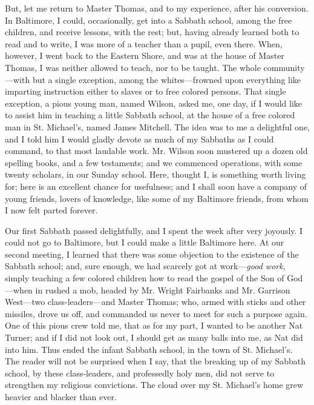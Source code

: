 But, let me return to Master Thomas, and to my experience, after his
conversion. In Baltimore, I could, occasionally, get into a Sabbath
school, among the free children, and receive lessons, with the rest;
but, having already learned both to read and to write, I was more of a
teacher than a pupil, even there. When, however, I went back to the
Eastern Shore, and was at the house of Master Thomas, I was neither
allowed to teach, nor to be taught. The whole community---with but a
single exception, among the whites---frowned upon everything like
imparting instruction either to slaves or to free colored persons. That
single exception, a pious young man, named Wilson, asked me, one day, if
I would like to assist him in teaching a little Sabbath school, at the
house of a free colored man in St. Michael's, named James Mitchell. The
idea was to me a delightful one, and I told him I would gladly devote as
much of my Sabbaths as I could command, to that most laudable work. Mr.
Wilson soon mustered up a dozen old spelling books, and a few
testaments; and we commenced operations, with some twenty scholars, in
our {}Sunday school. Here, thought I, is something worth living for;
here is an excellent chance for usefulness; and I shall soon have a
company of young friends, lovers of knowledge, like some of my Baltimore
friends, from whom I now felt parted forever.

Our first Sabbath passed delightfully, and I spent the week after very
joyously. I could not go to Baltimore, but I could make a little
Baltimore here. At our second meeting, I learned that there was some
objection to the existence of the Sabbath school; and, sure enough, we
had scarcely got at work---\emph{good work}, simply teaching a few
colored children how to read the gospel of the Son of God---when in
rushed a mob, headed by Mr. Wright Fairbanks and Mr. Garrison West---two
class-leaders---and Master Thomas; who, armed with sticks and other
missiles, drove us off, and commanded us never to meet for such a
purpose again. One of this pious crew told me, that as for my part, I
wanted to be another Nat Turner; and if I did not look out, I should get
as many balls into me, as Nat did into him. Thus ended the infant
Sabbath school, in the town of St. Michael's. The reader will not be
surprised when I say, that the breaking up of my Sabbath school, by
these class-leaders, and professedly holy men, did not serve to
strengthen my religious convictions. The cloud over my St. Michael's
home grew heavier and blacker than ever.

